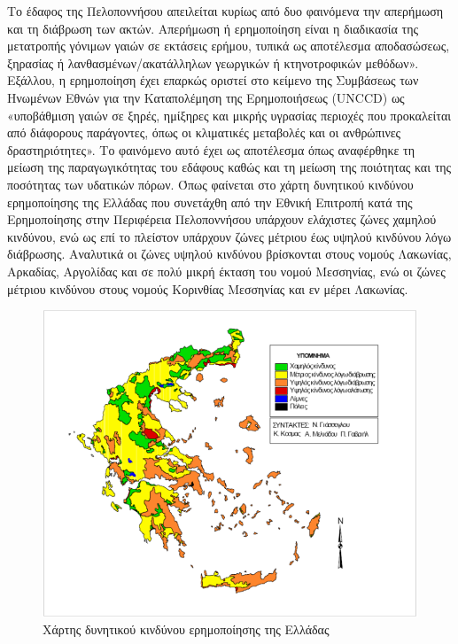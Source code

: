\documentclass[12pt]{article}
\begin{document}
	Το έδαφος της Πελοποννήσου απειλείται κυρίως από δυο φαινόμενα την απερήμωση και τη διάβρωση των ακτών. Απερήμωση ή ερημοποίηση είναι η διαδικασία της μετατροπής γόνιμων γαιών σε εκτάσεις ερήμου, τυπικά ως αποτέλεσμα αποδασώσεως, ξηρασίας ή λανθασμένων/ακατάλληλων γεωργικών ή κτηνοτροφικών μεθόδων». Εξάλλου, η ερημοποίηση έχει επαρκώς οριστεί στο κείμενο της Συμβάσεως των Ηνωμένων Εθνών για την Καταπολέμηση της Ερημοποιήσεως (UNCCD) ως «υποβάθμιση γαιών σε ξηρές, ημίξηρες και μικρής υγρασίας περιοχές που προκαλείται από διάφορους παράγοντες, όπως οι κλιματικές μεταβολές και οι ανθρώπινες δραστηριότητες». Το φαινόμενο αυτό έχει ως αποτέλεσμα όπως αναφέρθηκε τη μείωση της παραγωγικότητας του εδάφους καθώς και τη μείωση της ποιότητας και της ποσότητας των υδατικών πόρων.
	Όπως φαίνεται στο χάρτη δυνητικού κινδύνου ερημοποίησης της Ελλάδας που συνετάχθη από την Εθνική Επιτροπή κατά της Ερημοποίησης στην Περιφέρεια Πελοποννήσου υπάρχουν ελάχιστες ζώνες χαμηλού κινδύνου, ενώ ως επί το πλείστον υπάρχουν ζώνες μέτριου έως υψηλού κινδύνου λόγω διάβρωσης. Αναλυτικά οι ζώνες υψηλού κινδύνου βρίσκονται στους νομούς Λακωνίας, Αρκαδίας, Αργολίδας και σε πολύ μικρή έκταση του νομού Μεσσηνίας, ενώ οι ζώνες μέτριου κινδύνου στους νομούς Κορινθίας Μεσσηνίας και εν μέρει Λακωνίας.
	
	\begin{figure} [H]
		\begin{center}
			\includegraphics [scale = 0.60] {erimopoiisi.png}
			\caption{Χάρτης δυνητικού κινδύνου ερημοποίησης της Ελλάδας}
			\label{erimopoiisi}
		\end{center}
	\end{figure}
\end{document}
